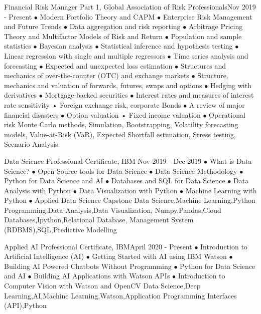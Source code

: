 \begin{prodevs}
 
     \prodev 
    {Financial Risk Manager Part 1, Global Association of Risk Professionals}{Nov 2019 - Present}
   {}
    {$\bullet$ Modern Portfolio Theory and CAPM
    $\bullet$ Enterprise Risk Management and Future Trends $\bullet$ Data aggregation and risk reporting  $\bullet$ Arbitrage Pricing Theory and Multifactor Models of Risk and Return 
    $\bullet$ Population and sample statistics  $\bullet$ Bayesian analysis
$\bullet$ Statistical inference and hypothesis testing
$\bullet$ Linear regression with single and multiple regressors
$\bullet$ Time series analysis and forecasting
$\bullet$ Expected and unexpected loss estimation  $\bullet$ Structures and mechanics of over-the-counter
(OTC) and exchange markets $\bullet$ Structure, mechanics and valuation of forwards,
futures, swaps and options $\bullet$  Hedging with derivatives
    $\bullet$ Mortgage-backed securities
    $\bullet$ Interest rates and measures of interest
rate sensitivity
• Foreign exchange risk, corporate Bonds
    $\bullet$ A review of major financial disasters $\bullet$  Option valuation
• Fixed income valuation $\bullet$ Operational risk}
    {Monte Carlo methods, Simulation, Bootstrapping, Volatility forecasting models, Value-at-Risk (VaR), Expected Shortfall estimation, Stress testing, Scenario Analysis}
    
    \prodev 
    {Data Science Professional Certificate, IBM }{Nov 2019 - Dec 2019}
    {}
    {$\bullet$ What is Data Science? $\bullet$ Open Source tools for Data Science $\bullet$ Data Science Methodology $\bullet$ Python for Data Science and AI $\bullet$ Databases and SQL for Data Science $\bullet$ Data Analysis with Python $\bullet$ Data Visualization with Python $\bullet$ Machine Learning with Python $\bullet$ Applied Data Science Capstone }
    {Data Science,Machine Learning,Python Programming,Data Analysis,Data Visualization, Numpy,Pandas,Cloud Databases,Ipython,Relational Database, Management System (RDBMS),SQL,Predictive Modelling}
   
   \prodev 
    {Applied AI Professional Certificate, IBM}{April 2020 - Present}
   {}
    {$\bullet$ Introduction to Artificial Intelligence (AI)
    $\bullet$ Getting Started with AI using IBM Watson
    $\bullet$ Building AI Powered Chatbots Without Programming
    $\bullet$ Python for Data Science and AI
    $\bullet$ Building AI Applications with Watson APIs
    $\bullet$ Introduction to Computer Vision with Watson and OpenCV}
    {Data Science,Deep Learning,AI,Machine Learning,Watson,Application Programming Interfaces (API),Python}
    

\end{prodevs}
